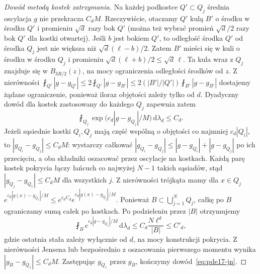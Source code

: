 \begin{proof}[Dowód metodą kostek zatrzymania]
Na każdej podkostce $Q'\subset Q_j$ średnia oscylacja
$g$ nie przekracza $C_dM$. Rzeczywiście, otaczamy $Q'$
kulą $B'$ o środku w środku $Q'$ i promieniu
$\sqrt d$ razy bok $Q'$ (można też wybrać promień
$\sqrt d/2$ razy bok $Q'$ dla kostki otwartej).
Jeśli $b$ jest bokiem $Q'$, to odległość środka
$Q'$ od środka $Q_j$ jest nie większa niż
$\sqrt d(\ell-b)/2$. Zatem $B'$ mieści się w kuli
o środku w środku $Q_j$ i promieniu
$\sqrt d(\ell+b)/2\le\sqrt d\,\ell$.
Ta kula wraz z $Q_j$ znajduje się w $B_{3R/2}(z)$,
na mocy ograniczenia odległości środków od $z$. Z nierówności
$\fint_{Q'}|g-g_{Q'}|\le
2\fint_{Q'}|g-g_{B'}|\le
2(|B'|/|Q'|)\fint_{B'}|g-g_{B'}|$
dostajemy żądane ograniczenie, ponieważ iloraz objętości
zależy tylko od $d$. Dyadyczny dowód dla kostek
zastosowany do każdego $Q_j$ zapewnia zatem
\[
 \fint_{Q_j}\exp\bigl(c_d|g-g_{Q_j}|/M\bigr)
 \,\mathrm d\lambda_d\le C_d.
\]
Jeżeli sąsiednie kostki $Q_i,Q_j$ mają część wspólną
o objętości co najmniej $c_d|Q_i|$, to
$|g_{Q_i}-g_{Q_j}|\le C_dM$: wystarczy całkować
$|g_{Q_i}-g_{Q_j}|\le
|g-g_{Q_i}|+|g-g_{Q_j}|$ po ich przecięciu,
a oba składniki oszacować przez oscylacje na kostkach.
Każdą parę kostek pokrycia łączy łańcuch co najwyżej
$N-1$ takich sąsiadów, stąd
$|g_{Q_j}-g_{Q_1}|\le C_dM$ dla wszystkich $j$.
Z nierówności trójkąta mamy dla $x\in Q_j$
$e^{c_d|g(x)-g_{Q_1}|/M}
\le e^{c_d C_d}e^{c_d|g(x)-g_{Q_j}|/M}$.
Ponieważ $B\subset\bigcup_{j=1}^N Q_j$, całkę po $B$
ograniczamy sumą całek po kostkach. Po podzieleniu
przez $|B|$ otrzymujemy
\[
 \fint_B e^{c_d|g-g_{Q_1}|/M}\,\mathrm d\lambda_d
 \le C_d\frac{N\ell^d}{|B|}\le C'_d,
\]
gdzie ostatnia stała zależy wyłącznie od $d$,
na mocy konstrukcji pokrycia.
Z nierówności Jensena lub bezpośrednio z oszacowania
pierwszego momentu wynika
$|g_B-g_{Q_1}|\le C_dM$. Zastępując $g_{Q_1}$
przez $g_B$, kończymy dowód~\eqref{eq:pde17-jn}.
\end{proof}

